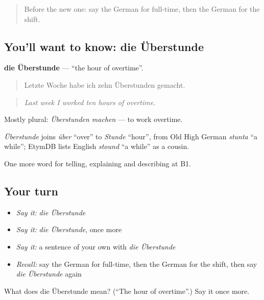 \begin{quote}
Before the new one: say the German for full-time, then the German for the shift.
\end{quote}

\subsection*{You'll want to know: die Überstunde}
\textbf{die Überstunde} — \textquotedblleft{}the hour of overtime\textquotedblright{}.

\begin{quote}
Letzte Woche habe ich zehn Überstunden gemacht.
\end{quote}

\begin{quote}
\emph{Last week I worked ten hours of overtime.}
\end{quote}

Mostly plural: \emph{Überstunden machen} — to work overtime.

\begin{cousinweb}
\emph{Überstunde} joins \emph{über} \textquotedblleft{}over\textquotedblright{} to \emph{Stunde} \textquotedblleft{}hour\textquotedblright{}, from Old High German \emph{stunta} \textquotedblleft{}a while\textquotedblright{}; EtymDB lists English \emph{stound} \textquotedblleft{}a while\textquotedblright{} as a cousin.
\end{cousinweb}

\begin{grammarlens}[title={What you've built}]
One more word for telling, explaining and describing at B1.
\end{grammarlens}

\subsection*{Your turn}
\begin{itemize}
\raggedright
  \item \emph{Say it:} \emph{die Überstunde}
  \item \emph{Say it:} \emph{die Überstunde}, once more
  \item \emph{Say it:} a sentence of your own with \emph{die Überstunde}
  \item \emph{Recall:} say the German for full-time, then the German for the shift, then say \emph{die Überstunde} again
\end{itemize}

\begin{tcolorbox}[breakable,colback=teal!4,colframe=teal!35!black,title={Before you move on}]
What does die Überstunde mean? (\textquotedblleft{}The hour of overtime\textquotedblright{}.) Say it once more.
\end{tcolorbox}
